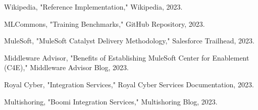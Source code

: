 \documentclass[11pt,a4paper]{article}
\begin{document}
\begin{thebibliography}{99}
 Wikipedia, "Reference Implementation," Wikipedia, 2023.

 MLCommons, "Training Benchmarks," GitHub Repository, 2023.

 MuleSoft, "MuleSoft Catalyst Delivery Methodology," Salesforce Trailhead, 2023.

 Middleware Advisor, "Benefits of Establishing MuleSoft Center for Enablement (C4E)," Middleware Advisor Blog, 2023.

 Royal Cyber, "Integration Services," Royal Cyber Services Documentation, 2023.

 Multishoring, "Boomi Integration Services," Multishoring Blog, 2023.

\end{thebibliography}



\end{document}
